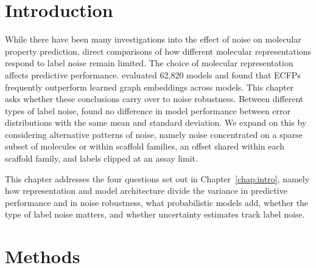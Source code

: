 
\section{Introduction}


While there have been many investigations into the effect of noise on molecular property prediction, direct comparisons of how different molecular representations respond to label noise remain limited. The choice of molecular representation affects predictive performance. \citet{Deng2023} evaluated 62,820 models and found that ECFPs frequently outperform learned graph embeddings across models. This chapter asks whether these conclusions carry over to noise robustness. Between different types of label noise, \citet{Heid2023} found no difference in model performance between error distributions with the same mean and standard deviation. We expand on this by considering alternative patterns of noise, namely noise concentrated on a sparse subset of molecules or within scaffold families, an offset shared within each scaffold family, and labels clipped at an assay limit.

This chapter addresses the four questions set out in Chapter~\ref{chap:intro}, namely how representation and model architecture divide the variance in predictive performance and in noise robustness, what probabilistic models add, whether the type of label noise matters, and whether uncertainty estimates track label noise.

\section{Methods}\label{sec:robustness:methods}

